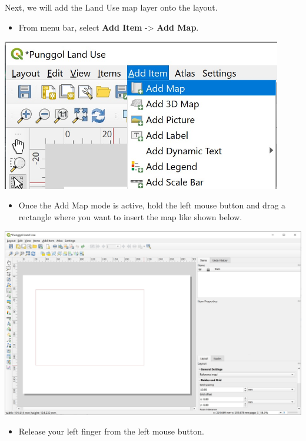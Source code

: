 \documentclass[
  letterpaper,
  DIV=11,
  numbers=noendperiod]{scrreprt}
\providecommand{\tightlist}{%
  \setlength{\itemsep}{0pt}\setlength{\parskip}{0pt}}\usepackage{longtable,booktabs,array}
\begin{document}
Next, we will add the Land Use map layer onto the layout.

\begin{itemize}
\tightlist
\item
  From menu bar, select \textbf{Add Item} -\textgreater{} \textbf{Add
  Map}.
\end{itemize}

\includegraphics[width=4.82292in,height=\textheight]{./img04/image46.jpg}

\begin{itemize}
\tightlist
\item
  Once the Add Map mode is active, hold the left mouse button and drag a
  rectangle where you want to insert the map like shown below.
\end{itemize}

\includegraphics{./img04/image47.jpg}

\begin{itemize}
\tightlist
\item
  Release your left finger from the left mouse button.
\end{itemize}
\end{document}
